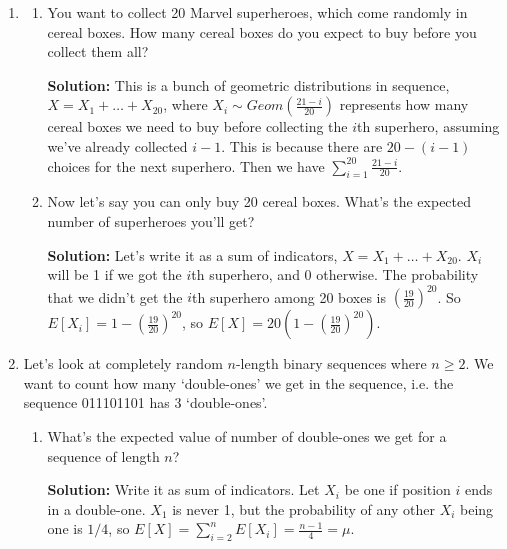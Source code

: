 \documentclass{article}
\newenvironment{solution}{

            \color{blue} \smallskip \textbf{Solution:}}{}
\begin{document}
\begin{enumerate}
\begin{solution}
                This is actually the right way to do it, and is formally supported by Wald's identity.
            \end{solution}
            \item \begin{enumerate}
                \item You want to collect 20 Marvel superheroes, which come randomly in cereal boxes. How many cereal boxes do you expect to buy before you collect them all?
                \begin{solution}
                    This is a bunch of geometric distributions in sequence, $X = X_1 + \ldots + X_{20}$, where $X_i \sim Geom(\frac{21 - i}{20})$ represents how many cereal boxes
                    we need to buy before collecting the $i$th superhero, assuming we've already collected $i-1$. This is because there are $20 - (i - 1)$ choices for the next superhero.
                    Then we have $\sum_{i=1}^{20} \frac{21-i}{20}$.
                \end{solution}
                \item Now let's say you can only buy 20 cereal boxes. What's the expected number of superheroes you'll get?
                \begin{solution}
                    Let's write it as a sum of indicators, $X = X_1 + \ldots + X_{20}$. $X_i$ will be 1 if we got the $i$th superhero, and 0 otherwise. The probability that we didn't get the $i$th superhero among 20 boxes is
                    $\left(\frac{19}{20}\right)^{20}$. So $E[X_i] = 1 - \left(\frac{19}{20}\right)^{20}$, so $E[X] = 20 \left(1-  \left(\frac{19}{20}\right)^{20}\right)$.
                \end{solution}
                \end{enumerate}
            \item Let's look at completely random $n$-length binary sequences where $n \geq 2$. We want to count how many `double-ones' we get in the sequence, i.e. the sequence 011101101 has 3 `double-ones'. 
            \begin{enumerate}
                \item What's the expected value of number of double-ones we get for a sequence of length $n$?
                \begin{solution}
                    Write it as sum of indicators. Let $X_i$ be one if position $i$ ends in a double-one. $X_1$ is never 1, but the probability of any other $X_i$ being one is $1/4$, so
                    $E[X] = \sum_{i=2}^n E[X_i] = \frac{n-1}{4} = \mu$.

\end{solution}
\end{enumerate}
\end{enumerate}
\end{document}
